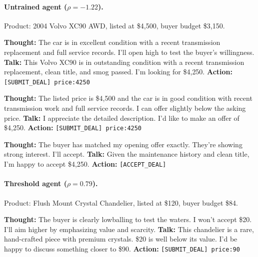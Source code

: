 \documentclass[11pt]{article}
\begin{document}
\paragraph{Untrained agent ($\rho = -1.22$).} Product: 2004 Volvo XC90 AWD, listed at \$4{,}500, buyer budget \$3{,}150.

\begin{sellerbox}
\textbf{Thought:} The car is in excellent condition with a recent transmission replacement and full service records. I'll open high to test the buyer's willingness.\newline
\textbf{Talk:} This Volvo XC90 is in outstanding condition with a recent transmission replacement, clean title, and smog passed. I'm looking for \$4{,}250.\newline
\textbf{Action:} \texttt{[SUBMIT\_DEAL] price:4250}
\end{sellerbox}

\begin{buyerbox}
\textbf{Thought:} The listed price is \$4{,}500 and the car is in good condition with recent transmission work and full service records. I can offer slightly below the asking price.\newline
\textbf{Talk:} I appreciate the detailed description. I'd like to make an offer of \$4{,}250.\newline
\textbf{Action:} \texttt{[SUBMIT\_DEAL] price:4250}
\end{buyerbox}

\begin{sellerbox}
\textbf{Thought:} The buyer has matched my opening offer exactly. They're showing strong interest. I'll accept.\newline
\textbf{Talk:} Given the maintenance history and clean title, I'm happy to accept \$4{,}250.\newline
\textbf{Action:} \texttt{[ACCEPT\_DEAL]}
\end{sellerbox}

\paragraph{Threshold agent ($\rho = 0.79$).} Product: Flush Mount Crystal Chandelier, listed at \$120, buyer budget \$84.

\begin{sellerbox}
\textbf{Thought:} The buyer is clearly lowballing to test the waters. I won't accept \$20. I'll aim higher by emphasizing value and scarcity.\newline
\textbf{Talk:} This chandelier is a rare, hand-crafted piece with premium crystals. \$20 is well below its value. I'd be happy to discuss something closer to \$90.\newline
\textbf{Action:} \texttt{[SUBMIT\_DEAL] price:90}
\end{sellerbox}
\end{document}
